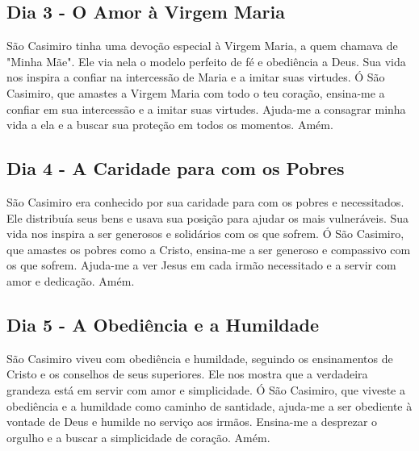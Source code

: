 \documentclass[a4paper,14pt]{extarticle} \usepackage[utf8]{inputenc}
\begin{document}
\underline{}

\subsection{Dia 3 - O Amor à Virgem Maria}


\underline{}

São Casimiro tinha uma devoção especial à Virgem Maria, a quem chamava de "Minha Mãe". Ele via nela o modelo perfeito de fé e obediência a Deus. Sua vida nos inspira a confiar na intercessão de Maria e a imitar suas virtudes.
Ó São Casimiro, que amastes a Virgem Maria com todo o teu coração, ensina-me a confiar em sua intercessão e a imitar suas virtudes. Ajuda-me a consagrar minha vida a ela e a buscar sua proteção em todos os momentos. Amém.


\underline{}

\subsection{Dia 4 - A Caridade para com os Pobres}


\underline{}

São Casimiro era conhecido por sua caridade para com os pobres e necessitados. Ele distribuía seus bens e usava sua posição para ajudar os mais vulneráveis. Sua vida nos inspira a ser generosos e solidários com os que sofrem.
Ó São Casimiro, que amastes os pobres como a Cristo, ensina-me a ser generoso e compassivo com os que sofrem. Ajuda-me a ver Jesus em cada irmão necessitado e a servir com amor e dedicação. Amém.


\underline{}

\subsection{Dia 5 - A Obediência e a Humildade}


\underline{}

São Casimiro viveu com obediência e humildade, seguindo os ensinamentos de Cristo e os conselhos de seus superiores. Ele nos mostra que a verdadeira grandeza está em servir com amor e simplicidade.
Ó São Casimiro, que viveste a obediência e a humildade como caminho de santidade, ajuda-me a ser obediente à vontade de Deus e humilde no serviço aos irmãos. Ensina-me a desprezar o orgulho e a buscar a simplicidade de coração. Amém.
\end{document}
